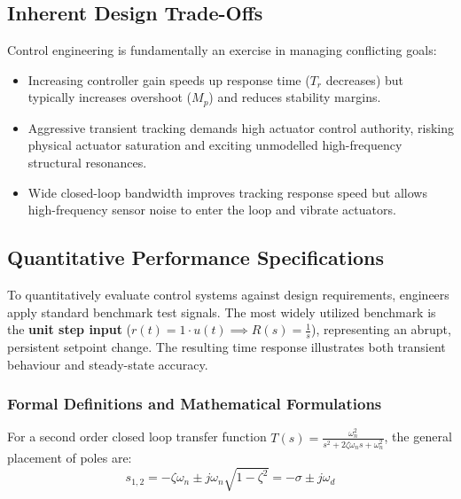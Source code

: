 \documentclass[12pt,onecolumn,twoside ]{article}
\begin{document}
	\subsection{Inherent Design Trade-Offs}
	Control engineering is fundamentally an exercise in managing conflicting goals:
	\begin{itemize}
		\item
		Increasing controller gain speeds up response time ($T_r$ decreases) but typically increases overshoot ($M_p$) and reduces stability margins.
		\item
		Aggressive transient tracking demands high actuator control authority, risking physical actuator saturation and exciting unmodelled high-frequency structural resonances.
		\item
		Wide closed-loop bandwidth improves tracking response speed but allows high-frequency sensor noise to enter the loop and vibrate actuators.
	\end{itemize}
	
	\subsection{Quantitative Performance Specifications}
	To quantitatively evaluate control systems against design requirements, engineers apply standard benchmark test signals. The most widely utilized benchmark is the \textbf{unit step input} ($r(t) = 1 \cdot u(t) \implies R(s) = \frac{1}{s}$), representing an abrupt, persistent setpoint change.
	The resulting time response illustrates both transient behaviour and steady-state accuracy.
	\subsubsection{Formal Definitions and Mathematical Formulations}
	For a second order closed loop transfer function $T(s) = \frac{\omega_n^2}{s^2 + 2\zeta\omega_n s + \omega_n^2}$, the general placement of poles are:
	\[
	s_{1,2} = -\zeta\omega_n \pm j\omega_n\sqrt{1 - \zeta^2} = -\sigma \pm j\omega_d
	\]
\end{document}
